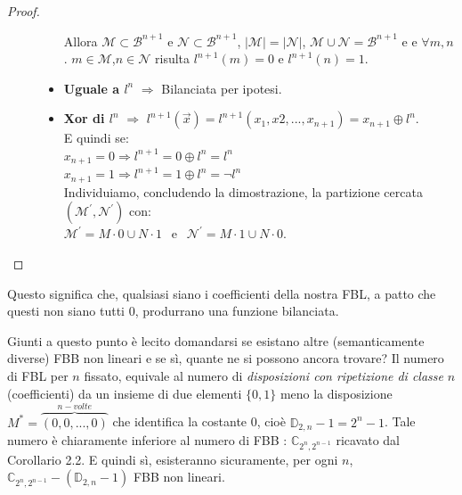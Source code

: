 \documentclass[12pt,a4paper,openright]{report}
\newcommand*\xor{\mathbin{\oplus}}
\begin{document}
\begin{proof}
\begin{description}
\begin{itemize}
                                                              Allora $\mathcal{M}\subset\mathcal{B}^{n+1}$ e $\mathcal{N}\subset\mathcal{B}^{n+1}$, ${\left\vert{\mathcal{M}}\right\vert} = {\left\vert{\mathcal{N}}\right\vert}$, $\mathcal{M} \cup \mathcal{N} = \mathcal{B}^{n+1}$ e
                                                              e $\forall m,n$. $m\in\mathcal{M}$,$n \in\mathcal{N}$ risulta $l^{n+1}(m) = 0$ e $ l^{n+1}(n) = 1$.
                                    \item \textbf{Uguale a $l^n$} $\Rightarrow$ Bilanciata per ipotesi. 
                                    \item \textbf{Xor di $l^n$} $\Rightarrow$ $l^{n+1}(\vec{x}) = l^{n+1}(x_1,x2,...,x_{n+1})= x_{n+1} \xor l^n$.
                                    \\ E quindi se:\\
                                    $x_{n+1} = 0 \Rightarrow l^{n+1} = 0 \xor l^n = l^n$ \\
                                    $x_{n+1} = 1 \Rightarrow l^{n+1} = 1 \xor l^n = \neg l^n$\\
                                    Individuiamo, concludendo la dimostrazione, la partizione cercata $(\mathcal{M^\prime},\mathcal{N^\prime})$ con:\\
                                    $\mathcal{M^\prime} = M\cdot0 \cup N\cdot1 \:\:$  e  $\:\: \mathcal{N^\prime} = M\cdot1 \cup N\cdot0$.
                                \end{itemize}
    \end{description}
\end{proof}
\noindent Questo significa che, qualsiasi siano i coefficienti della nostra FBL, a patto che questi non siano tutti $0$, produrrano una funzione bilanciata.\par

Giunti a questo punto è lecito domandarsi se esistano altre (semanticamente diverse) FBB  non lineari e se sì, quante ne si possono ancora trovare?
Il numero di FBL per $n$ fissato, equivale al numero di \textit{disposizioni con ripetizione di classe} $n$ (coefficienti) da un insieme di due elementi $\{0,1\}$ meno la disposizione $M^*=\overbrace{(0,0,...,0)}^{n-volte}$ che identifica la costante 0, cioè $\mathbb{D}_{2,n}-1= 2^n - 1$.
Tale numero è chiaramente inferiore al numero di FBB : $\mathbb{C}_{2^n,2^{n-1}}$ ricavato dal Corollario 2.2. E quindi sì, esisteranno sicuramente, per ogni $n$, $\mathbb{C}_{2^n,2^{n-1}} - (\mathbb{D}_{2,n} - 1)$ FBB non lineari.
\end{document}
